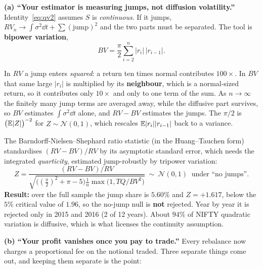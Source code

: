 \documentclass[11pt,a4paper]{article}
\begin{document}
\textbf{(a) ``Your estimator is measuring jumps, not diffusion volatility.''}
Identity~\eqref{eq:qv2} assumes $S$ is \emph{continuous}. If it jumps,
$RV_n\to\int\sigma^2\dd t+\sum(\text{jump})^2$ and the two parts must be separated. The tool is
\textbf{bipower variation},
\[
  BV=\frac{\pi}{2}\sum_{i=2}^{n}|r_i|\,|r_{i-1}| .
\]
\begin{whybox}
In $RV$ a jump enters \emph{squared}: a return ten times normal contributes $100\times$. In
$BV$ that same large $|r_i|$ is multiplied by its \textbf{neighbour}, which is a normal-sized
return, so it contributes only $10\times$ and only to one term of the sum. As $n\to\infty$ the
finitely many jump terms are averaged away, while the diffusive part survives, so $BV$
estimates $\int\sigma^2\dd t$ alone, and $RV-BV$ estimates the jumps. The $\pi/2$ is
$\big(\mathbb{E}|Z|\big)^{-2}$ for $Z\sim\mathcal{N}(0,1)$, which rescales $\mathbb{E}|r_i||r_{i-1}|$ back to a
variance.
\end{whybox}
The Barndorff-Nielsen--Shephard ratio statistic (in the Huang--Tauchen form) standardises
$(RV-BV)/RV$ by its asymptotic standard error, which needs the integrated \emph{quarticity},
estimated jump-robustly by tripower variation:
\[
  Z=\frac{(RV-BV)/RV}
        {\sqrt{\big((\tfrac{\pi}{2})^2+\pi-5\big)\tfrac{1}{n}\max\!\big(1,TQ/BV^2\big)}}
   \ \sim\ \mathcal{N}(0,1)\ \text{ under ``no jumps''.}
\]
\textbf{Result:} over the full sample the jump share is $\mathbf{5.60\%}$ and
$Z=+1.617$, below the $5\%$ critical value of $1.96$, so the no-jump null is \textbf{not}
rejected. Year by year it is rejected only in 2015 and 2016 (2 of 12 years). About $94\%$ of
NIFTY quadratic variation is diffusive, which is what licenses the continuity assumption.

\textbf{(b) ``Your profit vanishes once you pay to trade.''}
Every rebalance now charges a proportional fee on the notional traded. Three separate things
come out, and keeping them separate is the point:
\end{document}
